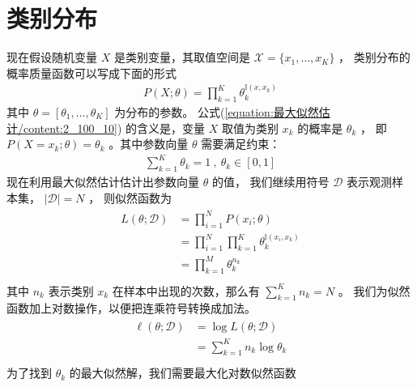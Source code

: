 \documentclass[letterpaper,10pt,english]{sphinxmanual}
\begin{document}
\section{类别分布}
\label{\detokenize{_u6700_u5927_u4f3c_u7136_u4f30_u8ba1/content:id4}}
现在假设随机变量 \(X\) 是类别变量，其取值空间是 \(\mathcal{X}=\{x_1,\dots,x_K\}\) ，
类别分布的概率质量函数可以写成下面的形式
\begin{equation}\label{equation:最大似然估计/content:2_100_10}
\begin{split} P(X;\theta) = \prod_{k=1}^{K} \theta_k^{\mathbb{I} (x,x_k)}\end{split}
\end{equation}
其中 \(\theta=[\theta_1,\dots,\theta_K]\) 为分布的参数。
公式(\ref{equation:最大似然估计/content:2_100_10}) 的含义是，变量 \(X\) 取值为类别 \(x_k\) 的概率是 \(\theta_k\) ，
即  \(P(X=x_k;\theta)=\theta_k\)
。其中参数向量 \(\theta\) 需要满足约束：
\begin{equation}\label{equation:最大似然估计/content:最大似然估计/content:12}
\begin{split}\sum_{k=1}^K \theta_k = 1
\ ,\
\theta_k \in [0,1]\end{split}
\end{equation}
现在利用最大似然估计估计出参数向量 \(\theta\) 的值，
我们继续用符号 \(\mathcal{D}\) 表示观测样本集，
\(|\mathcal{D}|=N\) ，
则似然函数为
\begin{align}\label{equation:最大似然估计/content:20_mutil_likelihood}\!\begin{aligned}
L(\theta;\mathcal{D}) &=  \prod_{i=1}^N P(x_i;\theta)\\
&= \prod_{i=1}^N \prod_{k=1}^{K} \theta_k^{\mathbb{I} (x_i,x_k)}\\
&=\prod_{k=1}^{M} \theta_k^{n_k}\\
\end{aligned}\end{align}
其中 \(n_k\) 表示类别 \(x_k\) 在样本中出现的次数，那么有 \(\sum_{k=1}^K n_k=N\) 。
我们为似然函数加上对数操作，以便把连乘符号转换成加法。
\begin{align}\label{equation:最大似然估计/content:最大似然估计/content:13}\!\begin{aligned}
\ell( \theta;\mathcal{D} ) &= \log L(\theta;\mathcal{D} )\\
&=   \sum_{k=1}^K {n_k} \log \theta_k\\
\end{aligned}\end{align}
为了找到 \(\theta_k\) 的最大似然解，我们需要最大化对数似然函数
\end{document}
